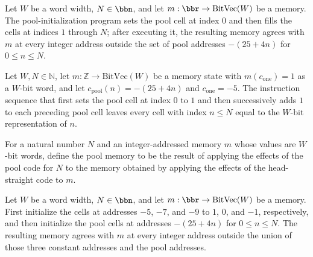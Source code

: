 \begin{theorem}
\label{Light.Compiler.agreeOutside_poolCode}
\leanok
{}
Let $W$ be a word width, $N\in\bbn$, and let $m:\bbr\to\text{BitVec}(W)$ be a memory.
The pool-initialization program sets the pool cell at index $0$ and then fills the cells
at indices $1$ through $N$; after executing it, the resulting memory agrees with $m$ at
every integer address outside the set of pool addresses $-(25+4n)$ for $0\le n\le N$.
\end{theorem}

\begin{theorem}
\label{Light.Compiler.effects_poolCode}
\leanok
{}
Let $W,N\in\mathbb{N}$, let $m:\mathbb{Z}\to\mathrm{BitVec}(W)$ be a memory state with
$m(c_{\mathrm{one}})=1$ as a $W$-bit word, and let $c_{\mathrm{pool}}(n)=-(25+4n)$ and
$c_{\mathrm{one}}=-5$. The instruction sequence that first sets the pool cell at index
$0$ to $1$ and then successively adds $1$ to each preceding pool cell leaves every cell
with index $n\le N$ equal to the $W$-bit representation of $n$.
\end{theorem}

\begin{definition}
\label{Light.Compiler.poolMem}
\leanok
{}
For a natural number $N$ and an integer-addressed memory $m$ whose values are $W$-bit
words, define the pool memory to be the result of applying the effects of the pool code
for $N$ to the memory obtained by applying the effects of the head-straight code to $m$.
\end{definition}

\begin{theorem}
\label{Light.Compiler.agreeOutside_poolMem}
\leanok
{}
Let $W$ be a word width, $N\in\bbn$, and let $m:\bbr\to\text{BitVec}(W)$ be a memory.
First initialize the cells at addresses $-5$, $-7$, and $-9$ to $1$, $0$, and $-1$,
respectively, and then initialize the pool cells at addresses $-(25+4n)$ for $0\le n\le
N$. The resulting memory agrees with $m$ at every integer address outside the union of
those three constant addresses and the pool addresses.
\end{theorem}

